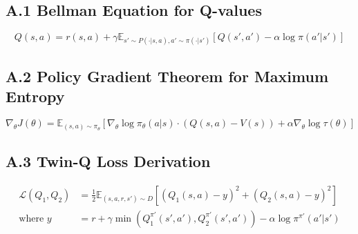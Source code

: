 \documentclass[10pt,a4paper,twocolumn]{article}
\begin{document}
\subsection{A.1 Bellman Equation for Q-values}
\begin{equation}
    Q(s,a) = r(s,a) + \gamma \mathbb{E}_{s' \sim P(\cdot|s,a),a' \sim \pi(\cdot|s')} [Q(s',a') - \alpha \log \pi(a'|s')]
\end{equation}

\subsection{A.2 Policy Gradient Theorem for Maximum Entropy}
\begin{equation}
    \nabla_\theta J(\theta) = \mathbb{E}_{(s,a)\sim\pi_\theta} \left[ \nabla_\theta \log \pi_\theta(a|s) \cdot (Q(s,a) - V(s)) + \alpha \nabla_\theta \log \tau(\theta) \right]
\end{equation}

\subsection{A.3 Twin-Q Loss Derivation}
\begin{align}
    \mathcal{L}(Q_1, Q_2) &= \frac{1}{2} \mathbb{E}_{(s,a,r,s')\sim D} \left[ (Q_1(s,a) - y)^2 + (Q_2(s,a) - y)^2 \right] \\
    \text{where } y &= r + \gamma \min\left(Q_1^{\pi'}(s',a'), Q_2^{\pi'}(s',a')\right) - \alpha \log \pi^{\pi'}(a'|s')
\end{align}

\end{document}
